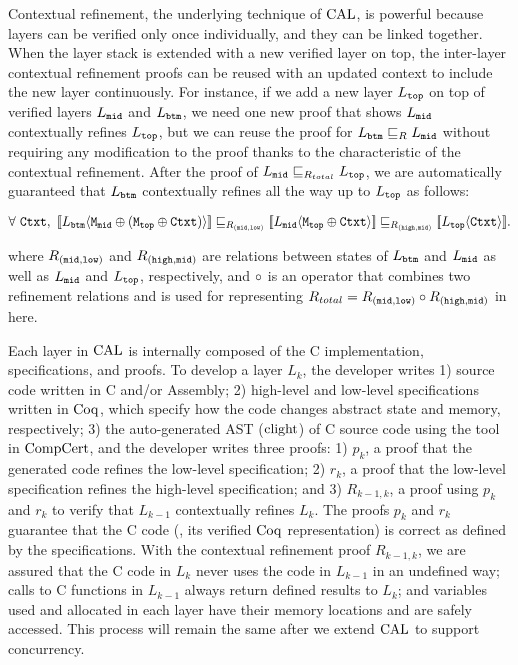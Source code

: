 Contextual refinement, the underlying technique of $\mathrm{CAL}$, is powerful because layers can be verified only once individually, and they can be linked together.
 When the layer stack is extended with a new verified layer on top, 
 the inter-layer contextual refinement proofs can be reused with an updated context to include the new layer continuously. 
For instance, if we add a new layer $L_{{\mathrm{\texttt{top}}}}$ on top of verified layers $L_{{\mathrm{\texttt{mid}}}}$ and $L_{{\mathrm{\texttt{btm}}}}$, 
we need one new proof that shows $L_{{\mathrm{\texttt{mid}}}}$ contextually refines $L_{{\mathrm{\texttt{top}}}}$, but we can reuse the proof for $L_{{\mathrm{\texttt{btm}}}} \sqsubseteq_{R} L_{{\mathrm{\texttt{mid}}}}$ without requiring any modification to the proof thanks to the characteristic of the contextual refinement. After the proof of $L_{{\mathrm{\texttt{mid}}}} \sqsubseteq_{{R}_{total}} L_{{\mathrm{\texttt{top}}}}$, we are automatically guaranteed that $L_{{\mathrm{\texttt{btm}}}}$ contextually refines all the way up to $L_{{\mathrm{\texttt{top}}}}$ as follows:
\begin{center}
$
\forall\ \codeinmath{Ctxt},\ \sem{L_{\codeinmath{btm}}}{\modulecompose{\codeinmath{M}_{\codeinmath{mid}}}{(\modulecompose{\codeinmath{M}_{\codeinmath{top}}}{\codeinmath{Ctxt})}}} \refines_{R_{(\codeinmath{mid}, \codeinmath{low})}}  \sem{L_{\codeinmath{mid}}}{\modulecompose{\codeinmath{M}_{\codeinmath{top}}}{\codeinmath{Ctxt}}} \refines_{R_{(\codeinmath{high}, \codeinmath{mid})}} \sem{L_{\codeinmath{top}}}{\codeinmath{Ctxt}}. 
$
\end{center}
where $R_{({\mathrm{\texttt{mid}}}, {\mathrm{\texttt{low}}})}$ and $R_{({\mathrm{\texttt{high}}}, {\mathrm{\texttt{mid}}})}$ are relations between states of $ L_{{\mathrm{\texttt{btm}}}}$ and $L_{{\mathrm{\texttt{mid}}}}$ as well as
 $ L_{{\mathrm{\texttt{mid}}}}$ and $L_{{\mathrm{\texttt{top}}}}$, respectively, 
and $\circ$ is an operator that combines two refinement relations and is used for representing  
 ${R}_{total} ={R_{({\mathrm{\texttt{mid}}}, {\mathrm{\texttt{low}}})}} \circ {{R_{({\mathrm{\texttt{high}}}, {\mathrm{\texttt{mid}}})}}}$ in here.


Each layer in $\mathrm{CAL}$ is internally composed of the C implementation, specifications, and proofs.
To develop a layer $L_k$, 
the developer writes 
1) source code written in C and/or Assembly; 
2) high-level and  low-level specifications written in $\mathrm{Coq}$, which specify how the code changes abstract state and memory, respectively; 
3) the auto-generated AST ($\mathrm{clight}$) of C source code using the tool in $\mathrm{CompCert}$,
and the developer writes three proofs: 
1) $p_k$, a proof that the generated code refines the low-level specification; 
2) $r_k$, a proof that the low-level specification refines the high-level specification; and 
3) $R_{k-1,k}$, a proof using $p_k$ and $r_k$ to verify that $L_{k-1}$ contextually refines $L_{k}$. 
The proofs $p_k$ and $r_k$ guarantee that the C code (\ie , its verified $\mathrm{Coq}$ representation) is correct as defined by the specifications.
 With the contextual refinement proof $R_{k-1, k}$, we are assured that the C code in $L_k$ never uses the code in $L_{k-1}$ in an undefined way; 
 calls to C functions in $L_{k-1}$ always return defined results to $L_k$; and variables 
 used and allocated in each layer have their memory locations and are safely accessed.
 This process will remain the same after we extend $\mathrm{CAL}$ to support concurrency.
